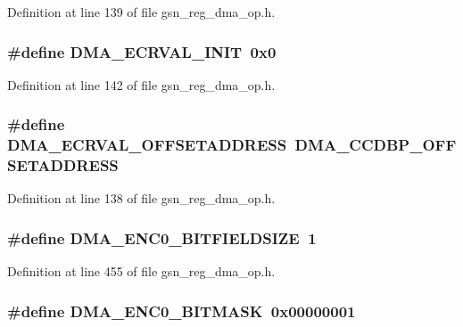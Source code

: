 Definition at line 139 of file gsn\_\-reg\_\-dma\_\-op.h.

\hypertarget{a00547_a3f41220330670a57a67cbaab18fc5e95}{
\subsubsection[{DMA\_\-ECRVAL\_\-INIT}]{\setlength{\rightskip}{0pt plus 5cm}\#define DMA\_\-ECRVAL\_\-INIT~0x0}}
\label{a00547_a3f41220330670a57a67cbaab18fc5e95}


Definition at line 142 of file gsn\_\-reg\_\-dma\_\-op.h.

\hypertarget{a00547_a1ba53edcece39b3c172d2b073a747e09}{
\subsubsection[{DMA\_\-ECRVAL\_\-OFFSETADDRESS}]{\setlength{\rightskip}{0pt plus 5cm}\#define DMA\_\-ECRVAL\_\-OFFSETADDRESS~DMA\_\-CCDBP\_\-OFFSETADDRESS}}
\label{a00547_a1ba53edcece39b3c172d2b073a747e09}


Definition at line 138 of file gsn\_\-reg\_\-dma\_\-op.h.

\hypertarget{a00547_a43b7b8c4115ad0c48348575c006b0c93}{
\subsubsection[{DMA\_\-ENC0\_\-BITFIELDSIZE}]{\setlength{\rightskip}{0pt plus 5cm}\#define DMA\_\-ENC0\_\-BITFIELDSIZE~1}}
\label{a00547_a43b7b8c4115ad0c48348575c006b0c93}


Definition at line 455 of file gsn\_\-reg\_\-dma\_\-op.h.

\hypertarget{a00547_ab043380a7b62306b88650d2576278839}{
\subsubsection[{DMA\_\-ENC0\_\-BITMASK}]{\setlength{\rightskip}{0pt plus 5cm}\#define DMA\_\-ENC0\_\-BITMASK~0x00000001}}
\label{a00547_ab043380a7b62306b88650d2576278839}


